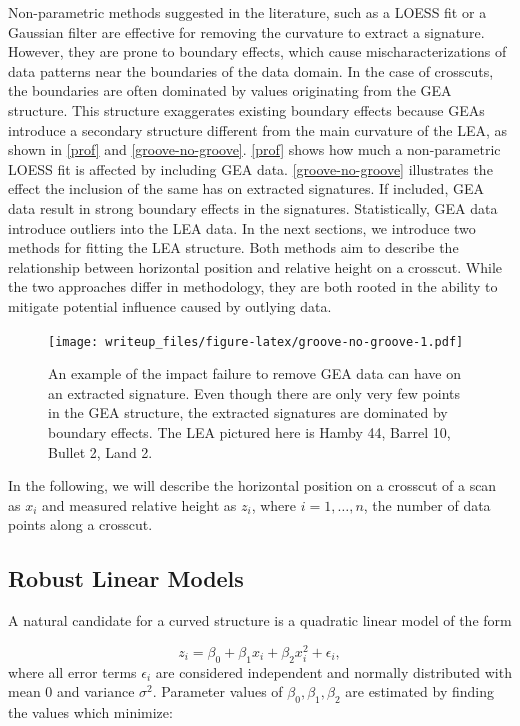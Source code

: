 \documentclass[12pt]{article}
\begin{document}
Non-parametric methods suggested in the literature, such as a LOESS fit
\citep{Hare1} or a Gaussian filter \citep{Chu1} are effective for
removing the curvature to extract a signature. However, they are prone
to boundary effects, which cause mischaracterizations of data patterns
near the boundaries of the data domain. In the case of crosscuts, the
boundaries are often dominated by values originating from the GEA
structure. This structure exaggerates existing boundary effects because
GEAs introduce a secondary structure different from the main curvature
of the LEA, as shown in \autoref{prof} and \autoref{groove-no-groove}.
\autoref{prof} shows how much a non-parametric LOESS fit is affected by
including GEA data. \autoref{groove-no-groove} illustrates the effect
the inclusion of the same has on extracted signatures. If included, GEA
data result in strong boundary effects in the signatures. Statistically,
GEA data introduce outliers into the LEA data. In the next sections, we
introduce two methods for fitting the LEA structure. Both methods aim to
describe the relationship between horizontal position and relative
height on a crosscut. While the two approaches differ in methodology,
they are both rooted in the ability to mitigate potential influence
caused by outlying data.

\begin{figure}
\centering
\texttt{[image: writeup\_files/figure-latex/groove-no-groove-1.pdf]}
\caption{\label{groove-no-groove}An example of the impact failure to
remove GEA data can have on an extracted signature. Even though there
are only very few points in the GEA structure, the extracted signatures
are dominated by boundary effects. The LEA pictured here is Hamby 44,
Barrel 10, Bullet 2, Land 2.}
\end{figure}

In the following, we will describe the horizontal position on a crosscut
of a scan as \(x_i\) and measured relative height as \(z_i\), where
\(i = 1, \dots, n\), the number of data points along a crosscut.

\subsection{Robust Linear Models}

A natural candidate for a curved structure is a quadratic linear model
of the form

\[
z_i = \beta_0 + \beta_1x_i + \beta_2 x_i^2 + \epsilon_i,
\] where all error terms \(\epsilon_i\) are considered independent and
normally distributed with mean \(0\) and variance \(\sigma^2\).
Parameter values of \(\beta_0, \beta_1, \beta_2\) are estimated by
finding the values which minimize:
\end{document}
